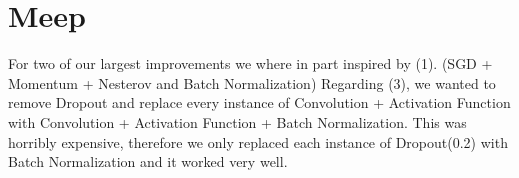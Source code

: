 \documentclass{article}
\begin{document}
	
	
	
	\section{Meep}
	For two of our largest improvements we where in part inspired by (1). (SGD + Momentum + Nesterov and Batch Normalization)
	Regarding (3), we wanted to remove Dropout and replace every instance of Convolution + Activation Function
	with Convolution + Activation Function + Batch Normalization. This was horribly expensive, therefore we only
	replaced each instance of Dropout(0.2) with Batch Normalization and it worked very well. 
	
\end{document}
